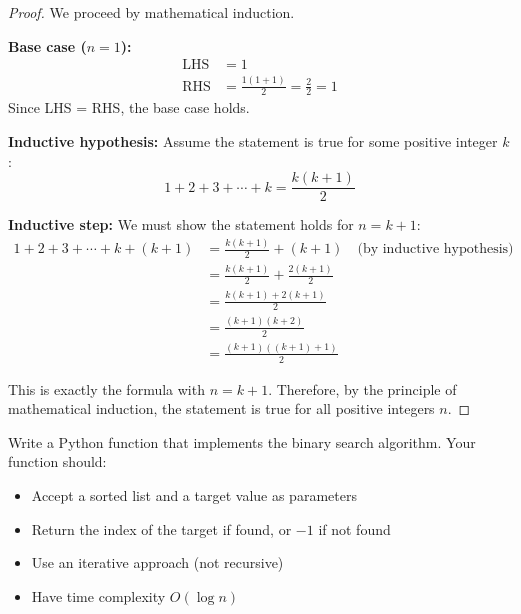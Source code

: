 \begin{solution}
\begin{proof}
We proceed by mathematical induction.

\textbf{Base case ($n = 1$):}
\begin{align*}
    \text{LHS} &= 1 \\
    \text{RHS} &= \frac{1(1+1)}{2} = \frac{2}{2} = 1
\end{align*}
Since LHS = RHS, the base case holds.

\textbf{Inductive hypothesis:} Assume the statement is true for some positive integer $k$:
\[
1 + 2 + 3 + \cdots + k = \frac{k(k+1)}{2}
\]

\textbf{Inductive step:} We must show the statement holds for $n = k + 1$:
\begin{align*}
    1 + 2 + 3 + \cdots + k + (k+1) &= \frac{k(k+1)}{2} + (k+1) \quad \text{(by inductive hypothesis)} \\
    &= \frac{k(k+1)}{2} + \frac{2(k+1)}{2} \\
    &= \frac{k(k+1) + 2(k+1)}{2} \\
    &= \frac{(k+1)(k+2)}{2} \\
    &= \frac{(k+1)((k+1)+1)}{2}
\end{align*}

This is exactly the formula with $n = k + 1$. Therefore, by the principle of mathematical induction, the statement is true for all positive integers $n$.
\end{proof}
\end{solution}

\begin{problem}
Write a Python function that implements the binary search algorithm. Your function should:
\begin{itemize}
    \item Accept a sorted list and a target value as parameters
    \item Return the index of the target if found, or $-1$ if not found
    \item Use an iterative approach (not recursive)
    \item Have time complexity $O(\log n)$
\end{itemize}
\end{problem}

